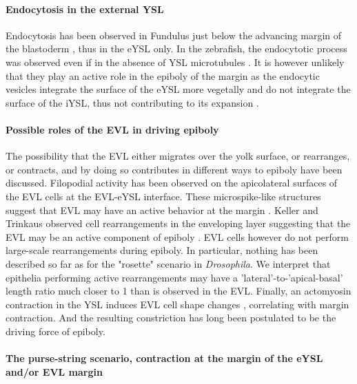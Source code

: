 \paragraph{Endocytosis in the external YSL}


Endocytosis has been observed in Fundulus just below the advancing margin of the blastoderm \cite{Betchaku:1978hm}, thus in the eYSL only. In the zebrafish, the endocytotic process was observed even if in the absence of YSL microtubules \cite{SolnicaKrezel:1994wl}. It is however unlikely that they play an active role in the epiboly of the margin as the endocytic vesicles integrate the surface of the eYSL more vegetally and do not integrate the surface of the iYSL, thus not contributing to its expansion \cite{Betchaku:1986tw}.

\paragraph{Possible roles of the EVL in driving epiboly}


The possibility that the EVL either migrates over the yolk surface, or rearranges, or contracts, and by doing so contributes in different ways to epiboly have been discussed. Filopodial activity has been observed on the apicolateral surfaces of the EVL cells at the EVL-eYSL interface. These microspike-like structures suggest that EVL may have an active behavior at the margin \cite{Zalik:1999tx}. Keller and Trinkaus observed cell rearrangements in the enveloping layer suggesting that the EVL may be an active component of epiboly \cite{Keller:1987va}. EVL cells however do not perform large-scale rearrangements during epiboly. In particular, nothing has been described so far as for the "rosette" scenario in \textit{Drosophila}\cite{Blankenship:2006jg}. We interpret that epithelia performing active rearrangements may have a 'lateral'-to-'apical-basal' length ratio much closer to 1 than is observed in the EVL. Finally, an actomyosin contraction in the YSL induces EVL cell shape changes \cite{Koppen:2006fy}, correlating with margin contraction. And the resulting constriction has long been postulated to be the driving force of epiboly.

\paragraph{The purse-string scenario, contraction at the margin of the eYSL and/or EVL margin}


